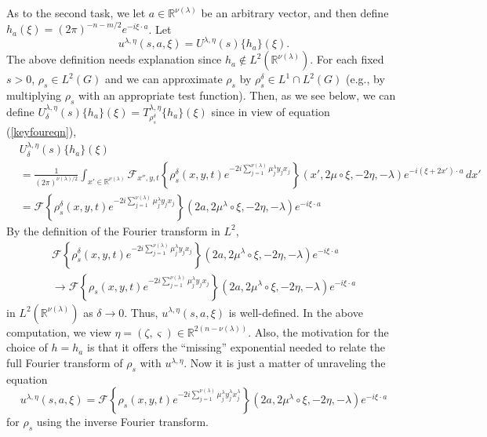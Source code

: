 \documentclass[12pt,reqno]{amsart}
\theoremstyle{definition}
\begin{document}
As to the second task, we let $a \in {\mathbb{R}}^{\nu(\lambda)}$ be an arbitrary
vector, and then define $h_a (\xi)= (2\pi)^{-n-m/2} e^{- i\xi \cdot a}$. Let
\[
u^{\lambda,\eta}(s,a, \xi)  = U^{\lambda,\eta}(s) \{h_a\}(\xi) .
\]
The above definition needs explanation since $h_a \not\in L^2({\mathbb{R}}^{\nu(\lambda)})$. For each fixed $s>0$,  $\rho_s\in L^2(G)$ and we can approximate $\rho_s$ by 
$\rho_s^\delta\in L^1\cap L^2(G)$ (e.g., by multiplying $\rho_s$ with an appropriate test function). Then, as we see below, we can define
$U^{\lambda,\eta}_\delta(s)\{ h_a\}(\xi) =  T_{\rho_s^\delta}^{\lambda,\eta} \{h_a\}(\xi)$ since 
in view of equation (\ref{keyfoureqn}),
\begin{align*}
&U^{\lambda,\eta}_\delta (s) \{h_a\}(\xi)\\
&= \frac{1}{(2 \pi)^{{\nu(\lambda)}/2} }\int_{x'\in{\mathbb{R}}^{{\nu(\lambda)}}} \mathcal{F}_{x'',y,t} \left\{ \rho_s^\delta(x,y,t)
e^{-2i \sum_{j=1}^{{\nu(\lambda)}} {\mu^\lambda_j} y_j x_j} \right\} (x', 2 \mu \circ \xi, -2\eta, -\lambda) e^{-i ( \xi + 2x') \cdot a} \, dx' \\
&=\mathcal{F} \left\{ \rho_s^\delta (x,y,t)
e^{-2i \sum_{j=1}^{\nu(\lambda)} {\mu^\lambda_j} y_j x_j} \right\}
(2a, 2 \mu^\lambda \circ \xi, -2\eta, -\lambda) e^{-i \xi \cdot a}
\end{align*}
By the definition of the Fourier transform in $L^2$, 
\begin{multline*}
\mathcal{F} \left\{ \rho_s^\delta (x,y,t)
e^{-2i \sum_{j=1}^{\nu(\lambda)} {\mu^\lambda_j} y_j x_j} \right\}
(2a, 2 \mu^\lambda \circ \xi, -2\eta, -\lambda) e^{-i \xi \cdot a} \\
\longrightarrow 
\mathcal{F} \left\{ \rho_s (x,y,t)
e^{-2i \sum_{j=1}^{\nu(\lambda)} {\mu^\lambda_j} y_j x_j} \right\}
(2a, 2 \mu^\lambda \circ \xi, -2\eta, -\lambda) e^{-i \xi \cdot a}
\end{multline*}
in $L^2({\mathbb{R}}^{\nu(\lambda)})$ as $\delta\to 0$. Thus, $u^{\lambda,\eta}(s,a,\xi)$ is well-defined.
In the above computation, we view $\eta = (\zeta,\varsigma)\in {\mathbb{R}}^{2(n-{\nu(\lambda)})}$. Also,
the motivation for the choice of $h = h_a$ is that 
it offers the ``missing'' exponential needed to 
relate the full Fourier transform of $\rho_s$ with $u^{\lambda,\eta}$.
Now it is just a matter of unraveling the equation
\begin{equation}
\label{ulambda1}
u^{\lambda,\eta}(s,a, \xi) = 
\mathcal{F} \left\{ \rho_s (x,y,t)
e^{-2i \sum_{j=1}^{\nu(\lambda)} {\mu^\lambda_j} y^\lambda_j x^\lambda_j} \right\}
(2a, 2 \mu^\lambda \circ \xi, -2\eta, -\lambda) e^{-i \xi \cdot a}
\end{equation}
for $\rho_s$ using the inverse Fourier transform.
\end{document}
